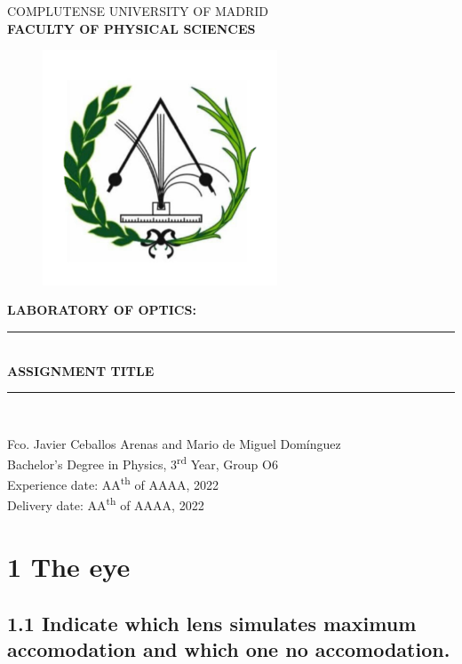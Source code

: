 \documentclass[a4paper, 12pt]{article}
\newcommand\blankpage{%
	\null
	\thispagestyle{empty}%
	\addtocounter{page}{-1}%
	\newpage}
\begin{document}
	\begin{titlepage}
		\centering
		\vfill
		\Large{COMPLUTENSE UNIVERSITY OF MADRID \\ \textbf{FACULTY OF PHYSICAL SCIENCES}}
		\vfill
		\begin{figure}[h!]
			\centering
			\includegraphics[height=7cm]{cumphysics}
		\end{figure}
		\vfill 
		\textbf{\Large{LABORATORY OF OPTICS:}}
		\rule [5pt]{14cm}{2pt}\\
		\LARGE{\textbf{ASSIGNMENT TITLE}} \\
		\rule [8pt]{14cm}{2pt}\\
		\vfill
		\vfill
		\vfill
		\vfill
		
		\large{Fco. Javier Ceballos Arenas and Mario de Miguel Domínguez\\ Bachelor's Degree in Physics, 3\textsuperscript{rd} Year, Group O6\\ Experience date: AA\textsuperscript{th} of AAAA, 2022\\ Delivery date: AA\textsuperscript{th} of AAAA, 2022}
		\vfill
		\vfill
		\vfill
		\vfill
		
		\afterpage{\blankpage}
	\end{titlepage}
	
	\makeatletter
	\thispagestyle{empty}
	\addtocounter{page}{-1}
	\let\latexl@section\l@section
	\def\l@section#1#2{\begingroup\let\numberline\@gobble\latexl@section{#1}{#2}\endgroup}
	\let\latexl@subsection\l@subsection
	\def\l@subsection#1#2{\begingroup\let\numberline\@gobble\latexl@subsection{#1}{#2}\endgroup}
	\let\latexl@subsubsection\l@subsubsection
	\def\l@subsubsection#1#2{\begingroup\let\numberline\@gobble\latexl@subsubsection{#1}{#2}\endgroup}
	\makeatother
	\tableofcontents	
	\thispagestyle{empty}
	\afterpage{\blankpage}
	\newpage
\section{1 The eye}
\subsection{1.1 Indicate which lens simulates maximum accomodation and which one no accomodation.}
\end{document}
